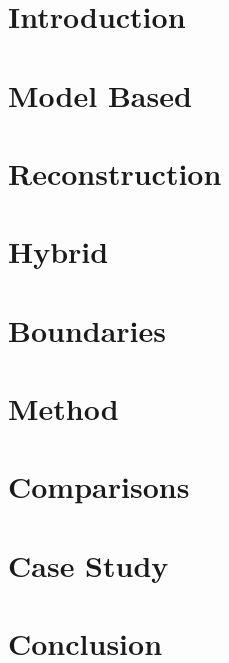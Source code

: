 \documentclass[]{article}
\title{}
\author{Bruno Duarte Corrêa}
\begin{document}
\maketitle

\begin{abstract}



\end{abstract}



\section{Introduction}


\section{Model Based}



\section{Reconstruction}


\section{Hybrid}



\section{Boundaries}


\section{Method}


\section{Comparisons}


\section{Case Study}



\section{Conclusion}




\end{document}
